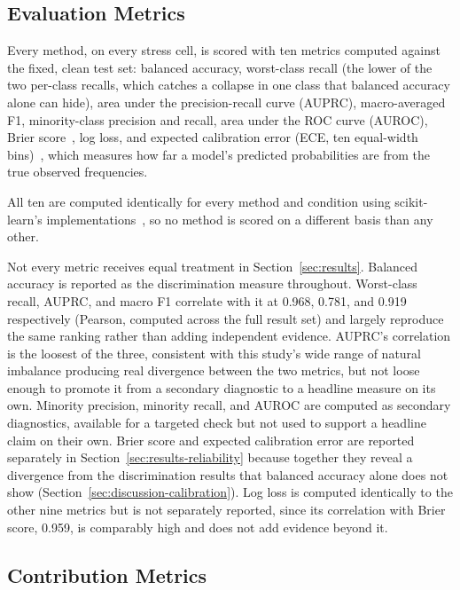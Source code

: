 \subsection{Evaluation Metrics}
\label{sec:methods-metrics}

Every method, on every stress cell, is scored with ten metrics computed
against the fixed, clean test set: balanced accuracy, worst-class recall
(the lower of the two per-class recalls, which catches a collapse in one
class that balanced accuracy alone can hide), area under the
precision-recall curve (AUPRC), macro-averaged F1, minority-class
precision and recall, area under the ROC curve (AUROC), Brier
score~\cite{brier1950verification}, log loss, and expected calibration
error (ECE, ten equal-width bins)~\cite{guo2017calibration}, which
measures how far a model's predicted probabilities are from the true
observed frequencies.

All ten are computed identically for every method and condition using
scikit-learn's implementations~\cite{pedregosa2011scikitlearn}, so no
method is scored on a different basis than any other.

Not every metric receives equal treatment in Section~\ref{sec:results}.
Balanced accuracy is reported as the discrimination measure throughout.
Worst-class recall, AUPRC, and macro F1 correlate with it at 0.968, 0.781,
and 0.919 respectively (Pearson, computed across the full result set) and
largely reproduce the same ranking rather than adding independent
evidence. AUPRC's correlation is the loosest of the three, consistent with
this study's wide range of natural imbalance producing real divergence
between the two metrics, but not loose enough to promote it from a
secondary diagnostic to a headline measure on its own. Minority precision,
minority recall, and AUROC are computed as
secondary diagnostics, available for a targeted check but not used to
support a headline claim on their own. Brier score and expected
calibration error are reported separately in
Section~\ref{sec:results-reliability} because together they reveal a
divergence from the discrimination results that balanced accuracy alone
does not show (Section~\ref{sec:discussion-calibration}). Log loss is
computed identically to the other nine metrics but is not separately
reported, since its correlation with Brier score, 0.959, is comparably
high and does not add evidence beyond it.

\subsection{Contribution Metrics}
\label{sec:methods-contribution}

